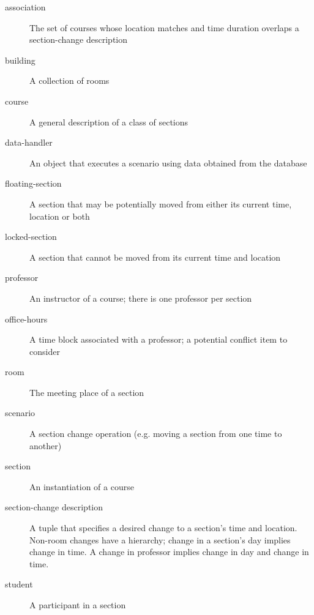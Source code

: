\begin{description}
  \item[association] The set of courses whose location matches and time duration overlaps a section-change description
  \item[building] A collection of rooms
  \item[course] A general description of a class of sections
  \item[data-handler] An object that executes a scenario using data obtained from the database
  \item[floating-section] A section that may be potentially moved from either its current time, location or both
  \item[locked-section] A section that cannot be moved from its current time and location
  \item[professor] An instructor of a course; there is one professor per section
  \item[office-hours] A time block associated with a professor; a potential conflict item to consider
  \item[room] The meeting place of a section
  \item[scenario] A section change operation (e.g. moving a section from one time to another)
  \item[section] An instantiation of a course
  \item[section-change description] A tuple that specifies a desired change to a section's time and location.  Non-room changes have a hierarchy; change in a section's day implies change in time.  A change in professor implies change in day and change in time.
  \item[student] A participant in a section
\end{description}
